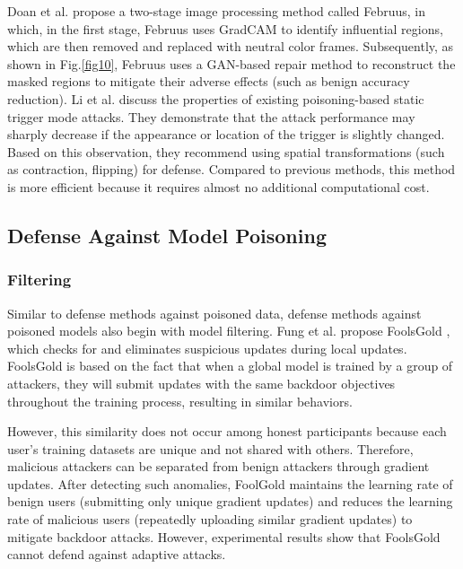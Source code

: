\documentclass[conference]{IEEEtran}
\begin{document}
Doan et al. \cite{b76} propose a two-stage image processing method called Februus, in which,
in the first stage, Februus uses GradCAM to identify influential regions, which are then
removed and replaced with neutral color frames. Subsequently, as shown in Fig.\ref{fig10}, Februus uses a GAN-based
repair method to reconstruct the masked regions to mitigate their adverse effects (such as benign accuracy reduction).
Li et al. \cite{b77} discuss the properties of existing poisoning-based static trigger mode attacks. They demonstrate
that the attack performance may sharply decrease if the appearance or location of the trigger is slightly changed.
Based on this observation, they recommend using spatial transformations (such as contraction, flipping)
for defense. Compared to previous methods, this method is more efficient because it requires almost no additional computational cost.

\subsection{Defense Against Model Poisoning}
\subsubsection{Filtering}
Similar to defense methods against poisoned data, defense methods against poisoned models also begin with model filtering.
Fung et al. propose FoolsGold \cite{b78}, which checks for and eliminates suspicious updates during local updates.
FoolsGold is based on the fact that when a global model is trained by a group of attackers, they will submit updates with
the same backdoor objectives throughout the training process, resulting in similar behaviors.

However, this similarity does not occur among honest participants because each user's training datasets are unique and not shared with others.
Therefore, malicious attackers can be separated from benign attackers through gradient updates. After detecting such anomalies,
FoolGold maintains the learning rate of benign users (submitting only unique gradient updates) and reduces the learning rate of malicious users
(repeatedly uploading similar gradient updates) to mitigate backdoor attacks. However, experimental results show that
FoolsGold cannot defend against adaptive attacks.
\end{document}
